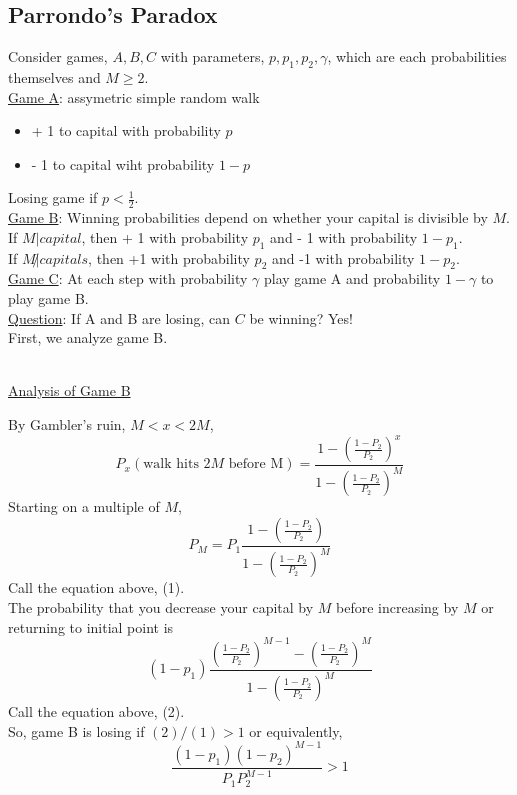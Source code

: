   \subsection*{Parrondo's Paradox}
    Consider games, $A, B, C$ with parameters, $p, p_1, p_2, \gamma$, which
    are each probabilities themselves and $M \ge 2$.\\
    \underline{Game A}: assymetric simple random walk
    \begin{itemize}
      \item + 1 to capital with probability $p$
      \item - 1 to capital wiht probability $1 - p$
    \end{itemize}
    Losing game if $p < \frac{1}{2}$.\\
    \underline{Game B}: Winning probabilities depend on whether your capital
    is divisible by $M$.\\
    If $M | capital$, then + 1 with probability $p_1$ and - 1 with probability 
    $1 - p_1$.\\
    If $M \not| capitals$, then +1 with probability $p_2$ and -1 with probability
    $1 - p_2$.\\
    \underline{Game C}: At each step with probability $\gamma$ play game A and
    probability $ 1 - \gamma$ to play game B.\\
    \underline{Question}: If A and B are losing, can $C$ be winning? Yes!\\
    First, we analyze game B.\\\\
    \begin{center}\underline{Analysis of Game B}\end{center}
    By Gambler's ruin, $M < x < 2M$,
    $$
      P_x(\text{walk hits $2M$ before M}) = \frac{1 - \left(\frac{1 - P_2}{P_2}
      \right)^x}{1 - \left(\frac{1 - P_2}{P_2}\right)^M}
    $$
    Starting on a multiple of $M$,
    $$
      P_M = P_1 \frac{1 - \left(\frac{1 - P_2}{P_2}\right)}{1 - \left(\frac{1
      - P_2}{P_2}\right)^M}
    $$
    Call the equation above, (1).\\
    The probability that you decrease your capital by $M$ before increasing by $M$ or
    returning to initial point is 
    $$
      (1 - p_1) \frac{\left(\frac{1 - P_2}{P_2}\right)^{M-1} - 
      \left(\frac{1 - P_2}{P_2}\right)^M}{1 - \left(\frac{1 - P_2}{P_2}\right)^M}
    $$
    Call the equation above, (2).\\
    So, game B is losing if $(2) / (1) > 1$ or equivalently,
    $$
      \frac{(1 - p_1)(1 - p_2)^{M - 1}}{P_1 P_2^{M - 1}} > 1
    $$

